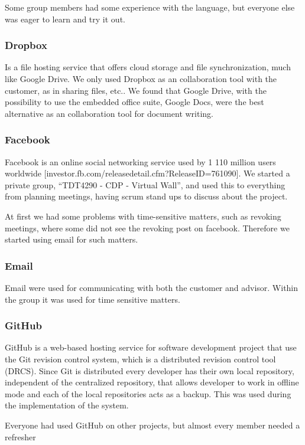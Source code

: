 \documentclass[11pt]{book}
\begin{document}
Some group members had some experience with the language, but everyone else was eager to learn and try it out.

\subsubsection{Dropbox}
Is a file hosting service that offers cloud storage and file synchronization, much like Google Drive. We only used Dropbox as an collaboration tool with the customer, as in sharing files, etc.. We found that Google Drive, with the possibility to use the embedded office suite, Google Docs, were the best alternative as an collaboration tool for document writing.

\subsubsection{Facebook}
Facebook is an online social networking service used by 1 110 million users worldwide [investor.fb.com/releasedetail.cfm?ReleaseID=761090]. We started a private group, ``TDT4290 - CDP - Virtual Wall'', and used this to everything from planning meetings, having scrum stand ups to discuss about the project. 

At first we had some problems with time-sensitive matters, such as revoking meetings, where some did not see the revoking post on facebook. Therefore we started using email for such matters.

\subsubsection{Email}
Email were used for communicating with both the customer and advisor. Within the group it was used for time sensitive matters.

\subsubsection{GitHub}
GitHub is a web-based hosting service for software development project that use the Git revision control system, which is a distributed revision control tool (DRCS). Since Git is distributed every developer has their own local repository, independent of the centralized repository, that allows developer to work in offline mode and each of the local repositories acts as a backup. This was used during the implementation of the system.

Everyone had used GitHub on other projects, but almost every member needed a refresher
\end{document}
